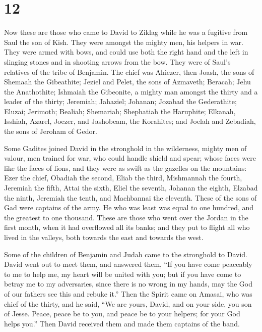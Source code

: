 \hypertarget{section-11}{%
\section{12}\label{section-11}}

 Now these are those who came to David to Ziklag while he
was a fugitive from Saul the son of Kish. They were amongst the mighty
men, his helpers in war.  They were armed with bows, and
could use both the right hand and the left in slinging stones and in
shooting arrows from the bow. They were of Saul's relatives of the tribe
of Benjamin.  The chief was Ahiezer, then Joash, the sons
of Shemaah the Gibeathite; Jeziel and Pelet, the sons of Azmaveth;
Beracah; Jehu the Anathothite;  Ishmaiah the Gibeonite, a
mighty man amongst the thirty and a leader of the thirty; Jeremiah;
Jahaziel; Johanan; Jozabad the Gederathite;  Eluzai;
Jerimoth; Bealiah; Shemariah; Shephatiah the Haruphite; 
Elkanah, Isshiah, Azarel, Joezer, and Jashobeam, the Korahites;
 and Joelah and Zebadiah, the sons of Jeroham of Gedor.

 Some Gadites joined David in the stronghold in the
wilderness, mighty men of valour, men trained for war, who could handle
shield and spear; whose faces were like the faces of lions, and they
were as swift as the gazelles on the mountains:  Ezer the
chief, Obadiah the second, Eliab the third,  Mishmannah
the fourth, Jeremiah the fifth,  Attai the sixth, Eliel
the seventh,  Johanan the eighth, Elzabad the ninth,
 Jeremiah the tenth, and Machbannai the eleventh.
 These of the sons of Gad were captains of the army. He
who was least was equal to one hundred, and the greatest to one
thousand.  These are those who went over the Jordan in
the first month, when it had overflowed all its banks; and they put to
flight all who lived in the valleys, both towards the east and towards
the west.

 Some of the children of Benjamin and Judah came to the
stronghold to David.  David went out to meet them, and
answered them, ``If you have come peaceably to me to help me, my heart
will be united with you; but if you have come to betray me to my
adversaries, since there is no wrong in my hands, may the God of our
fathers see this and rebuke it.''  Then the Spirit came
on Amasai, who was chief of the thirty, and he said, ``We are yours,
David, and on your side, you son of Jesse. Peace, peace be to you, and
peace be to your helpers; for your God helps you.'' Then David received
them and made them captains of the band.

